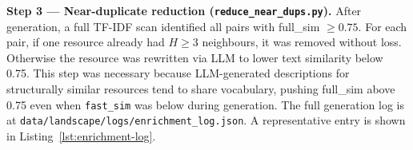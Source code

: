 

\medskip\noindent\textbf{Step 3 --- Near-duplicate reduction (\texttt{reduce\_near\_dups.py}).} After generation, a full TF-IDF scan identified all pairs with full\_sim $\geq 0.75$. For each pair, if one resource already had $H \geq 3$ neighbours, it was removed without loss. Otherwise the resource was rewritten via LLM to lower text similarity below 0.75. This step was necessary because LLM-generated descriptions for structurally similar resources tend to share vocabulary, pushing full\_sim above 0.75 even when \texttt{fast\_sim} was below during generation. The full generation log is at \texttt{data/landscape/logs/enrichment\_log.json}. A representative entry is shown in Listing~\ref{lst:enrichment-log}.

